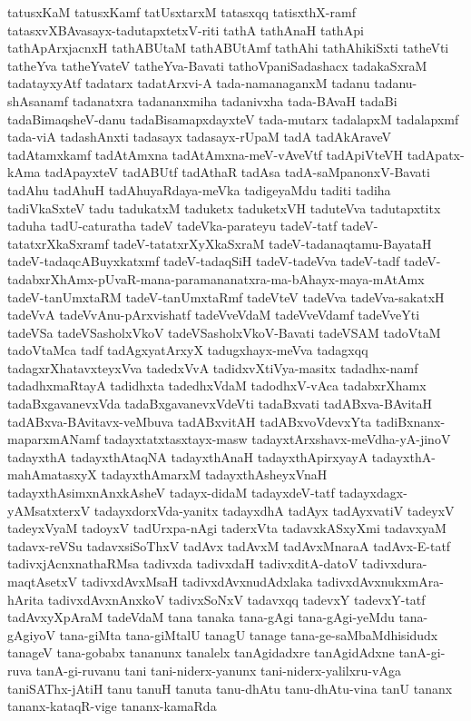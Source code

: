 {tatusxKaM
tatusxKamf
tatUsxtarxM
tatasxqq
tatisxthX-ramf
tatasxvXBAvasayx-tadutapxtetxV-riti
tathA
tathAnaH
tathApi
tathApArxjacnxH
tathABUtaM
tathABUtAmf
tathAhi
tathAhikiSxti
tatheVti
tatheYva
tatheYvateV
tatheYva-Bavati
tathoVpaniSadashacx
tadakaSxraM
tadatayxyAtf
tadatarx
tadatArxvi-A
tada-namanaganxM
tadanu
tadanu-shAsanamf
tadanatxra
tadananxmiha
tadanivxha
tada-BAvaH
tadaBi
tadaBimaqsheV-danu
tadaBisamapxdayxteV
tada-mutarx
tadalapxM
tadalapxmf
tada-viA
tadashAnxti
tadasayx
tadasayx-rUpaM
tadA
tadAkAraveV
tadAtamxkamf
tadAtAmxna
tadAtAmxna-meV-vAveVtf
tadApiVteVH
tadApatx-kAma
tadApayxteV
tadABUtf
tadAthaR
tadAsa
tadA-saMpanonxV-Bavati
tadAhu
tadAhuH
tadAhuyaRdaya-meVka
tadigeyaMdu
taditi
tadiha
tadiVkaSxteV
tadu
tadukatxM
taduketx
taduketxVH
taduteVva
tadutapxtitx
taduha
tadU-caturatha
tadeV
tadeVka-parateyu
tadeV-tatf
tadeV-tatatxrXkaSxramf
tadeV-tatatxrXyXkaSxraM
tadeV-tadanaqtamu-BayataH
tadeV-tadaqcABuyxkatxmf
tadeV-tadaqSiH
tadeV-tadeVva
tadeV-tadf
tadeV-tadabxrXhAmx-pUvaR-mana-paramananatxra-ma-bAhayx-maya-mAtAmx
tadeV-tanUmxtaRM
tadeV-tanUmxtaRmf
tadeVteV
tadeVva
tadeVva-sakatxH
tadeVvA
tadeVvAnu-pArxvishatf
tadeVveVdaM
tadeVveVdamf
tadeVveYti
tadeVSa
tadeVSasholxVkoV
tadeVSasholxVkoV-Bavati
tadeVSAM
tadoVtaM
tadoVtaMca
tadf
tadAgxyatArxyX
tadugxhayx-meVva
tadagxqq
tadagxrXhatavxteyxVva
tadedxVvA
tadidxvXtiVya-masitx
tadadhx-namf
tadadhxmaRtayA
tadidhxta
tadedhxVdaM
tadodhxV-vAca
tadabxrXhamx
tadaBxgavanevxVda
tadaBxgavanevxVdeVti
tadaBxvati
tadABxva-BAvitaH
tadABxva-BAvitavx-veMbuva
tadABxvitAH
tadABxvoVdevxYta
tadiBxnanx-maparxmANamf
tadayxtatxtasxtayx-masw
tadayxtArxshavx-meVdha-yA-jinoV
tadayxthA
tadayxthAtaqNA
tadayxthAnaH
tadayxthApirxyayA
tadayxthA-mahAmatasxyX
tadayxthAmarxM
tadayxthAsheyxVnaH
tadayxthAsimxnAnxkAsheV
tadayx-didaM
tadayxdeV-tatf
tadayxdagx-yAMsatxterxV
tadayxdorxVda-yanitx
tadayxdhA
tadAyx
tadAyxvatiV
tadeyxV
tadeyxVyaM
tadoyxV
tadUrxpa-nAgi
taderxVta
tadavxkASxyXmi
tadavxyaM
tadavx-reVSu
tadavxsiSoThxV
tadAvx
tadAvxM
tadAvxMnaraA
tadAvx-E-tatf
tadivxjAcnxnathaRMsa
tadivxda
tadivxdaH
tadivxditA-datoV
tadivxdura-maqtAsetxV
tadivxdAvxMsaH
tadivxdAvxnudAdxlaka
tadivxdAvxnukxmAra-hArita
tadivxdAvxnAnxkoV
tadivxSoNxV
tadavxqq
tadevxY
tadevxY-tatf
tadAvxyXpAraM
tadeVdaM
tana
tanaka
tana-gAgi
tana-gAgi-yeMdu
tana-gAgiyoV
tana-giMta
tana-giMtalU
tanagU
tanage
tana-ge-saMbaMdhisidudx
tanageV
tana-gobabx
tananunx
tanalelx
tanAgidadxre
tanAgidAdxne
tanA-gi-ruva
tanA-gi-ruvanu
tani
tani-niderx-yanunx
tani-niderx-yalilxru-vAga
taniSAThx-jAtiH
tanu
tanuH
tanuta
tanu-dhAtu
tanu-dhAtu-vina
tanU
tananx
tananx-kataqR-vige
tananx-kamaRda
}
